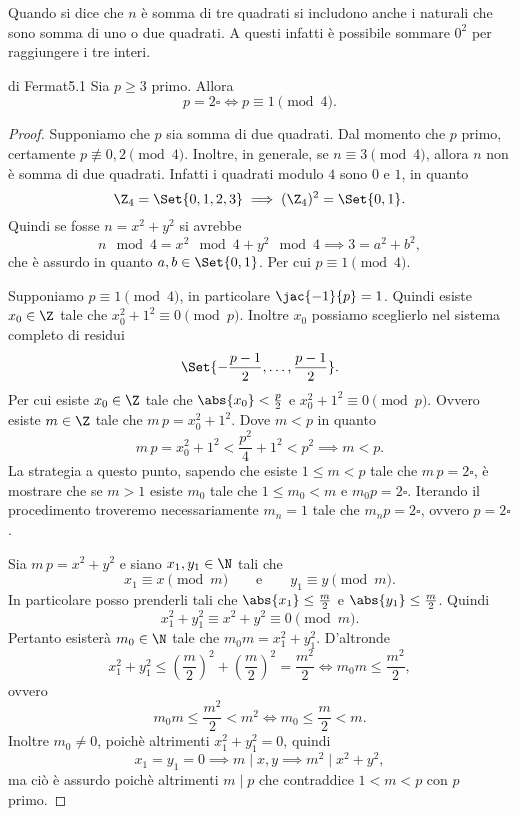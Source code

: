 \begin{oss}
	Quando si dice che \(n\) è somma di tre quadrati si includono anche i naturali che sono somma di uno o due quadrati.
	A questi infatti è possibile sommare \(0^2\) per raggiungere i tre interi.
\end{oss}

\begin{teor}{di Fermat}{5.1}
	Sia \(p\ge 3\) primo.
	Allora
	\[
		p = 2\square \iff p\equiv 1 \pmod{4}.
	\]
\end{teor}

\begin{proof}
	\graffito{\(\Rightarrow)\)}Supponiamo che \(p\) sia somma di due quadrati.
	Dal momento che \(p\) primo, certamente \(p\not\equiv 0,2\pmod{4}\).
	Inoltre, in generale, se \(n\equiv 3 \pmod{4}\), allora \(n\) non è somma di due quadrati.
	Infatti i quadrati modulo \(4\) sono \(0\) e \(1\), in quanto
	\[
		\Z_4 = \Set{0,1,2,3} \implies (\Z_4)^2 = \Set{0,1}.
	\]
	Quindi se fosse \(n=x^2+y^2\) si avrebbe
	\[
		n \mod 4 = x^2 \mod 4 + y^2 \mod 4 \implies 3 = a^2 + b^2,
	\]
	che è assurdo in quanto \(a,b\in \Set{0,1}\).
	Per cui \(p \equiv 1 \pmod{4}\).

	\graffito{\(\Leftarrow)\)}Supponiamo \(p\equiv 1 \pmod{4}\), in particolare \(\jac{-1}{p}=1\).
	Quindi esiste \(x_0\in\Z\) tale che \(x_0^2+1^2 \equiv 0 \pmod{p}\).
	Inoltre \(x_0\) possiamo sceglierlo nel sistema completo di residui
	\[
		\Set{-\frac{p-1}{2},\ldots,\frac{p-1}{2}}.
	\]
	Per cui esiste \(x_0\in\Z\) tale che \(\abs{x_0} < \frac{p}{2}\) e \(x_0^2+1^2 \equiv 0 \pmod{p}\).
	Ovvero esiste \(m\in\Z\) tale che \(m\,p = x_0^2+1^2\).
	Dove \(m<p\) in quanto
	\[
		m\,p = x_0^2 +1^2 < \frac{p^2}{4}+1^2 < p^2 \implies m<p.
	\]
	La strategia a questo punto, sapendo che esiste \(1\le m <p\) tale che \(m\,p = 2\square\), è mostrare che se \(m>1\) esiste \(m_0\) tale che \(1\le m_0<m\) e \(m_0 p = 2\square\).
	Iterando il procedimento troveremo necessariamente \(m_n=1\) tale che \(m_n p = 2\square\), ovvero \(p=2\square\).

	Sia \(m\,p = x^2+y^2\) e siano \(x_1,y_1 \in \N\) tali che
	\[
		x_1 \equiv x \pmod{m} \qquad\text{e}\qquad y_1 \equiv y \pmod{m}.
	\]
	In particolare posso prenderli tali che \(\abs{x_1}\le \frac{m}{2}\) e \(\abs{y_1}\le \frac{m}{2}\).
	Quindi
	\[
		x_1^2 + y_1^2 \equiv x^2+y^2 \equiv 0 \pmod{m}.
	\]
	Pertanto esisterà \(m_0\in\N\) tale che \(m_0 m = x_1^2+y_1^2\).
	D'altronde
	\[
		x_1^2+y_1^2 \le \left( \frac{m}{2} \right)^2 + \left( \frac{m}{2} \right)^2 = \frac{m^2}{2} \iff m_0 m \le \frac{m^2}{2},
	\]
	ovvero
	\[
		m_0 m \le \frac{m^2}{2} < m^2 \iff m_0 \le \frac{m}{2} < m.
	\]
	Inoltre \(m_0 \neq 0\), poichè altrimenti \(x_1^2+y_1^2 = 0\), quindi
	\[
		x_1 = y_1 = 0 \implies m\mid x, y \implies m^2 \mid x^2 + y^2,
	\]
	ma ciò è assurdo poichè altrimenti \(m \mid p\) che contraddice \(1 < m < p\) con \(p\) primo.


\end{proof}
